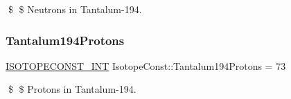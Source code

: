 \$ \$ Neutrons in Tantalum-\/194. \mbox{\label{group___isotope_const-_tantalum-_ta194_gab030eafaeebf3451533893554324ddbe}} 
\subsubsection{\texorpdfstring{Tantalum194\+Protons}{Tantalum194Protons}}
{\footnotesize\ttfamily \mbox{\hyperlink{group___isotope_const-_macros_ga5f18360b3e99483a35c32d789e62621c}{I\+S\+O\+T\+O\+P\+E\+C\+O\+N\+S\+T\+\_\+\+I\+NT}} Isotope\+Const\+::\+Tantalum194\+Protons = 73}

\$ \$ Protons in Tantalum-\/194. 